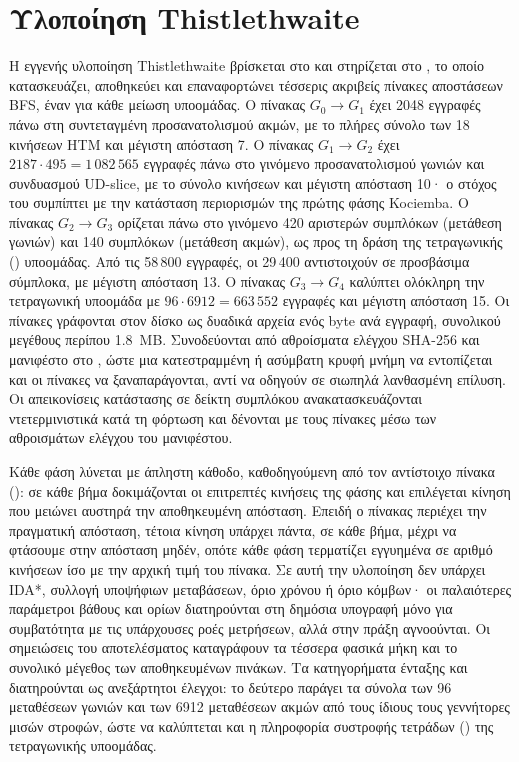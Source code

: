 \section{Υλοποίηση Thistlethwaite}
\label{sec:implementation-thistlethwaite}
Η εγγενής υλοποίηση Thistlethwaite βρίσκεται στο  και στηρίζεται στο , το οποίο κατασκευάζει, αποθηκεύει και επαναφορτώνει τέσσερις ακριβείς πίνακες αποστάσεων BFS, έναν για κάθε μείωση υποομάδας. Ο πίνακας \(G_0 \rightarrow G_1\) έχει 2048 εγγραφές πάνω στη συντεταγμένη προσανατολισμού ακμών, με το πλήρες σύνολο των 18 κινήσεων HTM και μέγιστη απόσταση 7. Ο πίνακας \(G_1 \rightarrow G_2\) έχει \(2187\cdot495=1\,082\,565\) εγγραφές πάνω στο γινόμενο προσανατολισμού γωνιών και συνδυασμού UD-slice, με το σύνολο κινήσεων  και μέγιστη απόσταση 10· ο στόχος του συμπίπτει με την κατάσταση περιορισμών της πρώτης φάσης Kociemba. Ο πίνακας \(G_2 \rightarrow G_3\) ορίζεται πάνω στο γινόμενο 420 αριστερών συμπλόκων (μετάθεση γωνιών) και 140 συμπλόκων (μετάθεση ακμών), ως προς τη δράση της τετραγωνικής () υποομάδας. Από τις 58\,800 εγγραφές, οι 29\,400 αντιστοιχούν σε προσβάσιμα σύμπλοκα, με μέγιστη απόσταση 13. Ο πίνακας \(G_3 \rightarrow G_4\) καλύπτει ολόκληρη την τετραγωνική υποομάδα με \(96\cdot6912=663\,552\) εγγραφές και μέγιστη απόσταση 15. Οι πίνακες γράφονται στον δίσκο ως δυαδικά αρχεία ενός byte ανά εγγραφή, συνολικού μεγέθους περίπου 1.8~MB. Συνοδεύονται από αθροίσματα ελέγχου SHA-256 και μανιφέστο στο , ώστε μια κατεστραμμένη ή ασύμβατη κρυφή μνήμη να εντοπίζεται και οι πίνακες να ξαναπαράγονται, αντί να οδηγούν σε σιωπηλά λανθασμένη επίλυση. Οι απεικονίσεις κατάστασης σε δείκτη συμπλόκου ανακατασκευάζονται ντετερμινιστικά κατά τη φόρτωση και δένονται με τους πίνακες μέσω των αθροισμάτων ελέγχου του μανιφέστου.

Κάθε φάση λύνεται με άπληστη κάθοδο, καθοδηγούμενη από τον αντίστοιχο πίνακα (): σε κάθε βήμα δοκιμάζονται οι επιτρεπτές κινήσεις της φάσης και επιλέγεται κίνηση που μειώνει αυστηρά την αποθηκευμένη απόσταση. Επειδή ο πίνακας περιέχει την πραγματική απόσταση, τέτοια κίνηση υπάρχει πάντα, σε κάθε βήμα, μέχρι να φτάσουμε στην απόσταση μηδέν, οπότε κάθε φάση τερματίζει εγγυημένα σε αριθμό κινήσεων ίσο με την αρχική τιμή του πίνακα. Σε αυτή την υλοποίηση δεν υπάρχει IDA*, συλλογή υποψήφιων μεταβάσεων, όριο χρόνου ή όριο κόμβων· οι παλαιότερες παράμετροι βάθους και ορίων διατηρούνται στη δημόσια υπογραφή μόνο για συμβατότητα με τις υπάρχουσες ροές μετρήσεων, αλλά στην πράξη αγνοούνται. Οι σημειώσεις του αποτελέσματος καταγράφουν τα τέσσερα φασικά μήκη και το συνολικό μέγεθος των αποθηκευμένων πινάκων. Τα κατηγορήματα ένταξης  και  διατηρούνται ως ανεξάρτητοι έλεγχοι: το δεύτερο παράγει τα σύνολα των 96 μεταθέσεων γωνιών και των 6912 μεταθέσεων ακμών από τους ίδιους τους γεννήτορες μισών στροφών, ώστε να καλύπτεται και η πληροφορία συστροφής τετράδων () της τετραγωνικής υποομάδας.

